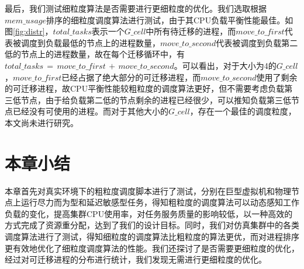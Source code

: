 最后，我们测试细粒度算法是否需要进行更细粒度的优化。我们选取根据$mem\_usage$排序的细粒度调度算法进行测试，由于其CPU负载平衡性能最佳。如图\ref{fig:distr}，$total\_tasks$表示一个$G\_cell$中所有待迁移的进程，而$move\_to\_first$代表被调度到负载最低的节点上的进程数量，$move\_to\_second$代表被调度到负载第二低的节点上的进程数量，故在每个迁移循环中，有$total\_tasks\,=\,move\_to\_first\,+\,move\_to\_second$。可以看出，对于大小为4的$G\_cell$，$move\_to\_first$已经占据了绝大部分的可迁移进程，而$move\_to\_second$使用了剩余的可迁移进程，故CPU平衡性能较粗粒度的调度算法更好，但不需要考虑负载第三低节点，由于给负载第二低的节点剩余的进程已经很少，可以推知负载第三低节点已经没有可使用的进程。而对于其他大小的$G\_cell$，存在一个最佳的调度粒度，本文尚未进行研究。

\section{本章小结}
本章首先对真实环境下的粗粒度调度脚本进行了测试，分别在巨型虚拟机和物理节点上运行尽力而为型和延迟敏感型任务，得知粗粒度的调度算法可以动态感知工作负载的变化，提高集群CPU使用率，对任务服务质量的影响较低，以一种高效的方式完成了资源重分配，达到了我们的设计目标。同时，我们对仿真集群中的各类调度算法进行了测试，得知细粒度的调度算法比粗粒度的算法更优，而对进程排序更有效地优化了细粒度调度算法的性能。我们还探讨了是否需要更细粒度的优化，经过对可迁移进程的分布进行统计，我们发现无需进行更细粒度的优化。
